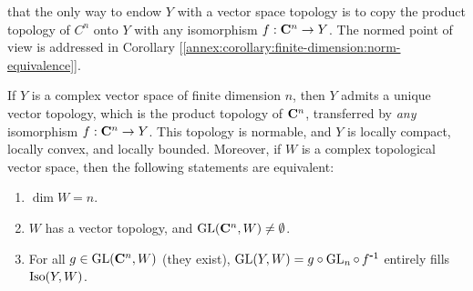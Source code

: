 that the only way to endow $Y$ with a vector space topology is to copy the product topology of $C^n$ onto $Y$ with any %
isomorphism $f: \mathbf{C}^n \to Y$. The normed point of view is addressed in Corollary %
[\ref{annex:corollary:finite-dimension:norm-equivalence}].
% 
\begin{theorem}\label{annex:theorem:topology-in-finite-dimension}
If $Y$ is a complex vector space of finite dimension $n$, then $Y$ admits a unique vector topology, which is the product %
topology of $\mathbf{C}^n$, transferred by \emph{any} isomorphism $f:\mathbf{C}^n \to Y$. %
% 
This topology is normable, and $Y$ is locally compact, locally convex, and locally bounded. %
% 
\skipline
Moreover, if $W$ is a complex topological vector space, then the following statements are equivalent: %
% 
\begin{enumerate}[item-label=(\alph{enumi})]
  \item $\dim{W} = n$.
  \item $W$ has a vector topology, and $\operatorname{GL}(\mathbf{C}^n, W) \neq \emptyset$.
  \item For all $g \in \operatorname{GL}(\mathbf{C}^n, W)$ (they exist), $\GL(Y, W)= g \circ \GL_n \circ \,f^{\minus 1}$ entirely fills $\operatorname{Iso}(Y, W)$.
\end{enumerate} 
% 
\end{theorem}
% 
